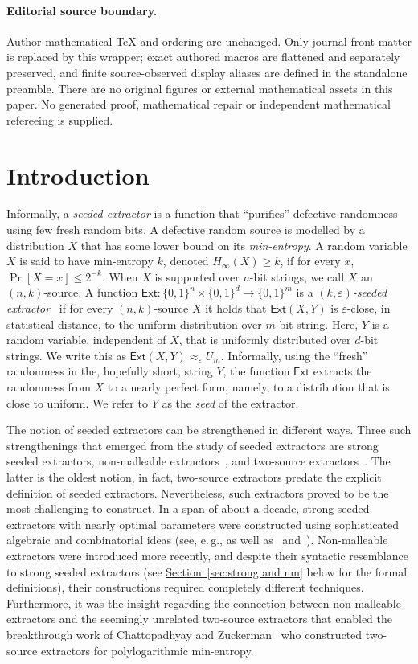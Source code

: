 \documentclass[11pt]{article}
\numberwithin{equation}{section}
\theoremstyle{definition}
\theoremstyle{plain}
\newcommand{\eg}{e.\,g.}
\newcommand{\expref}[2]{\hyperref[#2]{#1~\ref{#2}}}
\newcommand{\ext}{\mathsf{Ext}}
\newcommand{\eps}{\varepsilon}
\newcommand{\me}{{H_{\infty}}}
\begin{document}
\paragraph{Editorial source boundary.}
Author mathematical TeX and ordering are unchanged. Only journal front matter is replaced by this wrapper; exact authored macros are flattened and separately preserved, and finite source-observed display aliases are defined in the standalone preamble. There are no original figures or external mathematical assets in this paper.  No generated proof, mathematical repair or independent mathematical refereeing is supplied. 
\clearpage

%
%
%


\section{Introduction}


Informally, a \emph{seeded extractor} is a function that ``purifies'' defective randomness using few fresh  random bits. A defective random source is modelled by a distribution $X$ that has some
%
 lower bound on its \emph{min-entropy}. A random variable $X$ is said to have min-entropy $k$, denoted $\me(X) \ge k$, if for every $x$, $\Pr[X = x] \le 2^{-k}$.  When $X$ is supported over $n$-bit strings, we call $X$ an $(n,k)$-source. A function $\ext \colon \{0,1\}^n \times \{0,1\}^d \to \{0,1\}^m$ is a \emph{$(k,\eps)$-seeded extractor}~\cite{NZ96} if for every $(n,k)$-source $X$ it holds that $\ext(X,Y)$ is $\eps$-close, in statistical distance, to the uniform distribution over $m$-bit string. Here, $Y$ is a random variable, independent of $X$, that is uniformly distributed over $d$-bit strings. We write this as $\ext(X,Y) \approx_\eps U_m$. Informally, using the ``fresh'' randomness in the,
%
hopefully short, %
string $Y$, the function $\ext$ extracts the randomness from $X$ to a nearly perfect form, namely, to a distribution that is close to uniform. We refer to $Y$ as the \emph{seed} of the extractor.

The notion of seeded extractors can be strengthened in different ways. Three such strengthenings that emerged from the study of seeded extractors are strong seeded extractors, non-malleable extractors~\cite{DW09}, and two-source extractors~\cite{CG88}. The latter is the oldest notion, in fact, two-source extractors predate the explicit definition of seeded extractors. Nevertheless, such extractors proved to be the most challenging to construct. In a span of about a decade, strong seeded extractors with nearly optimal parameters were constructed using sophisticated algebraic and combinatorial ideas (see, \eg, \cite{Trevisan01,LRVW03,GUV09,DKSS13,TSU12} as well as~\cite{Shaltiel11} and~\cite[Chapter 6]{Vadhan12}). Non-malleable extractors were introduced more recently, and despite their syntactic resemblance to strong seeded extractors (see \expref{Section}{sec:strong and nm} below for the formal definitions), their constructions required completely different techniques. Furthermore, it was the insight regarding the connection between non-malleable extractors and the seemingly unrelated two-source extractors that enabled the breakthrough
work of Chattopadhyay and Zuckerman~\cite{CZ19} who constructed two-source extractors for
%
polylogarithmic  %
min-entropy. 
%
%
\end{document}
